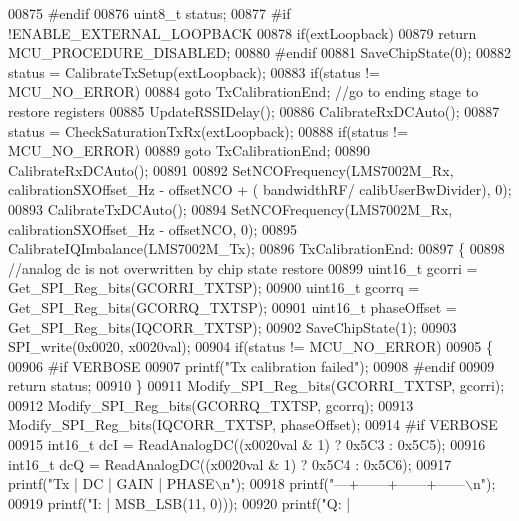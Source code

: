 \begin{DoxyCode}
{{{{{{{{{{{{{{{{{00875 \textcolor{preprocessor}{#endif}
00876     uint8\_t status;
00877 \textcolor{preprocessor}{#if !ENABLE\_EXTERNAL\_LOOPBACK}
00878     \textcolor{keywordflow}{if}(extLoopback)
00879         \textcolor{keywordflow}{return} MCU_PROCEDURE_DISABLED;
00880 \textcolor{preprocessor}{#endif}
00881     SaveChipState(0);
00882     status = CalibrateTxSetup(extLoopback);
00883     \textcolor{keywordflow}{if}(status != MCU_NO_ERROR)
00884         \textcolor{keywordflow}{goto} TxCalibrationEnd; \textcolor{comment}{//go to ending stage to restore registers}
00885     UpdateRSSIDelay();
00886     CalibrateRxDCAuto();
00887     status = CheckSaturationTxRx(extLoopback);
00888     \textcolor{keywordflow}{if}(status != MCU_NO_ERROR)
00889         \textcolor{keywordflow}{goto} TxCalibrationEnd;
00890     CalibrateRxDCAuto();
00891 
00892     SetNCOFrequency(LMS7002M_Rx, calibrationSXOffset_Hz - offsetNCO + (
      bandwidthRF/ calibUserBwDivider), 0);
00893     CalibrateTxDCAuto();
00894     SetNCOFrequency(LMS7002M_Rx, calibrationSXOffset_Hz - offsetNCO, 0);
00895     CalibrateIQImbalance(LMS7002M_Tx);
00896 TxCalibrationEnd:
00897     \{
00898         \textcolor{comment}{//analog dc is not overwritten by chip state restore}
00899         uint16\_t gcorri = Get_SPI_Reg_bits(GCORRI_TXTSP);
00900         uint16\_t gcorrq = Get_SPI_Reg_bits(GCORRQ_TXTSP);
00901         uint16\_t phaseOffset = Get_SPI_Reg_bits(IQCORR_TXTSP);
00902         SaveChipState(1);
00903         SPI_write(0x0020, x0020val);
00904         \textcolor{keywordflow}{if}(status != MCU_NO_ERROR)
00905         \{
00906 \textcolor{preprocessor}{#if VERBOSE}
00907             printf(\textcolor{stringliteral}{"Tx calibration failed"});
00908 \textcolor{preprocessor}{#endif}
00909             \textcolor{keywordflow}{return} status;
00910         \}
00911         Modify_SPI_Reg_bits(GCORRI_TXTSP, gcorri);
00912         Modify_SPI_Reg_bits(GCORRQ_TXTSP, gcorrq);
00913         Modify_SPI_Reg_bits(IQCORR_TXTSP, phaseOffset);
00914 \textcolor{preprocessor}{#if VERBOSE}
00915         int16\_t dcI = ReadAnalogDC((x0020val & 1) ? 0x5C3 : 0x5C5);
00916         int16\_t dcQ = ReadAnalogDC((x0020val & 1) ? 0x5C4 : 0x5C6);
00917         printf(\textcolor{stringliteral}{"Tx | DC   | GAIN | PHASE\(\backslash\)n"});
00918         printf(\textcolor{stringliteral}{"---+------+------+------\(\backslash\)n"});
00919         printf(\textcolor{stringliteral}{"I: | %
      MSB_LSB(11, 0)));
00920         printf(\textcolor{stringliteral}{"Q: | %
}}}}}}}}}}}}}}}}}}}
\end{DoxyCode}

